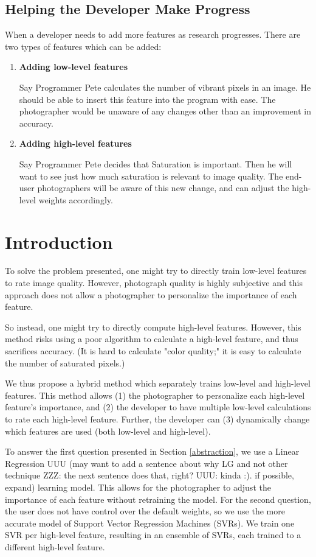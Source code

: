 \documentclass[11pt,letter]{article}
\begin{document}
\subsection{Helping the Developer Make Progress}
\label{easeofprogramming}
When a developer needs to add more features as research progresses. There are two types of features which can be added:
\begin{enumerate}
\item \textbf{Adding low-level features}

Say Programmer Pete calculates the number of vibrant pixels in an image. He should be able to insert this feature into the program with ease. The photographer would be unaware of any changes other than an improvement in accuracy.

\item \textbf{Adding high-level features}

Say Programmer Pete decides that Saturation is important. Then he will want to see just how much saturation is relevant to image quality. The end-user photographers will be aware of this new change, and can adjust the high-level weights accordingly.
\end{enumerate}

\section{Introduction}
To solve the problem presented, one might try to directly train low-level features to rate image quality. However, photograph quality is highly subjective and this approach does not allow a photographer to personalize the importance of each feature.

So instead, one might try to directly compute high-level features. However, this method risks using a poor algorithm to calculate a high-level feature, and thus sacrifices accuracy. (It is hard to calculate "color quality;" it is easy to calculate the number of saturated pixels.)

We thus propose a hybrid method which separately trains low-level and high-level features. This method allows (1) the photographer to personalize each high-level feature's importance, and (2) the developer to have multiple low-level calculations to rate each high-level feature. Further, the developer can (3) dynamically change which features are used (both low-level and high-level).

To answer the first question presented in Section \ref{abstraction}, we use a Linear Regression UUU (may want to add a sentence about why LG and not other technique ZZZ: the next sentence does that, right?
UUU: kinda :). if possible, expand)
 learning model. This allows for the photographer to adjust the importance of each feature without retraining the model. For the second question, the user does not have control over the default weights, so we use the more accurate model of Support Vector Regression Machines (SVRs)\cite{springerlink:10.1023/B:STCO.0000035301.49549.88}. We train one SVR per high-level feature, resulting in an ensemble of SVRs, each trained to a different high-level feature.
\end{document}
